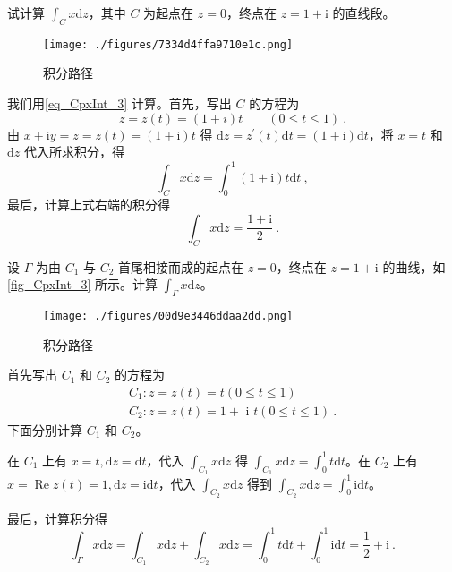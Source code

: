 \begin{example}{} \label{ex_CpxInt_1}
试计算 $\displaystyle \int_{C} x \mathrm{d} z$，其中 $C$ 为起点在 $z = 0$，终点在 $z =1+\mathrm i$ 的直线段。
\begin{figure}[ht]
\centering
\texttt{[image: ./figures/7334d4ffa9710e1c.png]}
\caption{积分路径} \label{fig_CpxInt_2}
\end{figure}

我们用\autoref{eq_CpxInt_3} 计算。首先，写出 $C$ 的方程为
\begin{equation}
z=z(t)=(1+i) t \qquad (0 \leqslant t \leqslant 1)~.
\end{equation}
由 $x+\mathrm{i} y=z=z(t)=(1+\mathrm{i}) t$ 得 $\mathrm{d} z=z^{\prime}(t) \mathrm{d} t=(1+\mathrm{i}) \mathrm{d} t$，将 $x=t$ 和 $\mathrm dz$ 代入所求积分，得
\begin{equation}
\int_{C} x \mathrm{d} z=\int_{0}^{1}(1+\mathrm{i}) t \mathrm{d} t~,
\end{equation}
最后，计算上式右端的积分得
\begin{equation}
\int_{C} x \mathrm{d} z=\frac{1+\mathrm{i}}{2}~.
\end{equation}
\end{example}

\begin{example}{} \label{ex_CpxInt_2}
设 $\Gamma$ 为由 $C_1$ 与 $C_2$ 首尾相接而成的起点在 $z=0$，终点在 $ z =1+ \mathrm i $ 的曲线，如\autoref{fig_CpxInt_3} 所示。计算 $\displaystyle \int_{\Gamma} x \mathrm{d}z$。
\begin{figure}[ht]
\centering
\texttt{[image: ./figures/00d9e3446ddaa2dd.png]}
\caption{积分路径} \label{fig_CpxInt_3}
\end{figure}

首先写出 $C_1$ 和 $C_2$ 的方程为
\begin{equation}
\begin{array}{l}C_{1}: z=z(t)=t(0 \leqslant t \leqslant 1) \\ C_{2}: z=z(t)=1+\text { i }t(0 \leqslant t \leqslant 1)~.\end{array}
\end{equation}
下面分别计算 $C_1$ 和 $C_2$。

在 $C_1$ 上有 $x=t, \mathrm{d} z=\mathrm{d} t$，代入 $\displaystyle \int_{C_{1}} x \mathrm{d} z$ 得 $\displaystyle \int_{C_{1}} x \mathrm{d} z=\int_{0}^{1} t \mathrm{d} t$。在 $C_2$ 上有 $\displaystyle x=\operatorname{Re} z(t)=1, \mathrm{d} z=\mathrm{id} t$，代入 $\displaystyle \int_{C_{2}} x \mathrm{d} z$ 得到 $\displaystyle \int_{C_{2}} x \mathrm{d} z=\int_{0}^{1} \mathrm{id} t$。

最后，计算积分得
\begin{equation}
\int_{\Gamma} x \mathrm{d} z=\int_{C_{1}} x \mathrm{d} z+\int_{C_{2}} x \mathrm{d} z=\int_{0}^{1} t \mathrm{d} t+\int_{0}^{1} \mathrm{i} \mathrm{d} t=\frac{1}{2}+\mathrm{i}~.
\end{equation}
\end{example}


